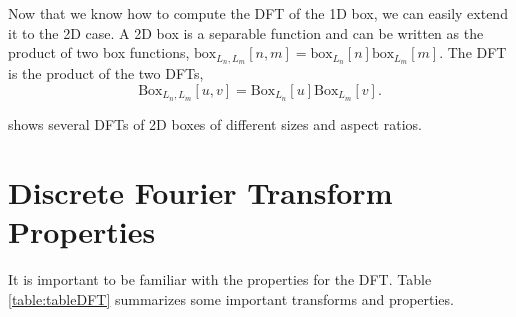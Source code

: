Now that we know how to compute the DFT of the 1D box, we can easily extend it to the 2D case. A 2D box is a separable function and can be written as the product of two box functions,
$\text{box}_{L_n, L_m} \left[n,m\right] = \text{box}_{L_n} \left[n\right] \text{box}_{L_m}\left[m\right]$. The DFT is the product of the two DFTs,
\begin{equation}
	\text{Box}_{L_n, L_m} \left[ u,v \right] = \text{Box}_{L_n} \left[ u\right] \text{Box}_{L_m} \left[ v\right].
\end{equation}

\Fig{\ref{fig:2ddftexamples}} shows several DFTs of 2D boxes of different sizes and aspect ratios.

\section{Discrete Fourier Transform Properties}
\label{section:DFTproperties}

It is important to be familiar with the properties for the DFT. Table \ref{table:tableDFT} summarizes some important transforms and properties.





